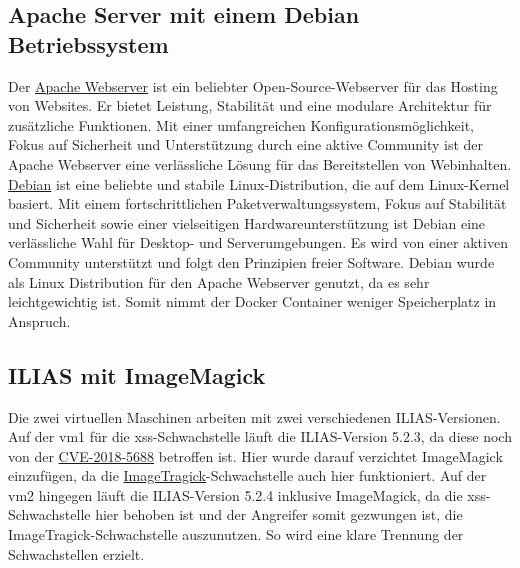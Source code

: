\documentclass[10pt, a4paper,onecolumn ,titlepage]{article}
\begin{document}
    \subsection{Apache Server mit einem Debian Betriebssystem}
    \label{subsec:apacheServer}
    Der \href{https://httpd.apache.org/}{Apache Webserver} ist ein beliebter Open-Source-Webserver für das Hosting von Websites.
    Er bietet Leistung, Stabilität und eine modulare Architektur für zusätzliche Funktionen.
    Mit einer umfangreichen Konfigurationsmöglichkeit, Fokus auf Sicherheit und Unterstützung durch eine aktive Community ist der Apache Webserver eine verlässliche Lösung für das Bereitstellen von Webinhalten.
    \href{https://www.debian.org/}{Debian} ist eine beliebte und stabile Linux-Distribution, die auf dem Linux-Kernel basiert.
    Mit einem fortschrittlichen Paketverwaltungssystem, Fokus auf Stabilität und Sicherheit sowie einer vielseitigen Hardwareunterstützung ist Debian eine verlässliche Wahl für Desktop- und Serverumgebungen.
    Es wird von einer aktiven Community unterstützt und folgt den Prinzipien freier Software.
    Debian wurde als Linux Distribution für den Apache Webserver genutzt, da es sehr leichtgewichtig ist.
    Somit nimmt der Docker Container weniger Speicherplatz in Anspruch.

    \subsection{ILIAS mit ImageMagick}
    \label{subsec:iliasTechnologie}
    Die zwei virtuellen Maschinen arbeiten mit zwei verschiedenen ILIAS-Versionen.
    Auf der \ac{vm}1 für die \ac{xss}-Schwachstelle läuft die ILIAS-Version 5.2.3, da diese noch von der \hyperref[subsubsec:CVE-2018-5688]{CVE-2018-5688} betroffen ist.
    Hier wurde darauf verzichtet ImageMagick einzufügen, da die \hyperref[subsubsec:CVE-2016-3714]{ImageTragick}-Schwachstelle auch hier funktioniert.
    Auf der \ac{vm}2 hingegen läuft die ILIAS-Version 5.2.4 inklusive ImageMagick, da die \ac{xss}-Schwachstelle hier behoben ist und der Angreifer somit gezwungen ist, die ImageTragick-Schwachstelle auszunutzen.
    So wird eine klare Trennung der Schwachstellen erzielt.
\end{document}
